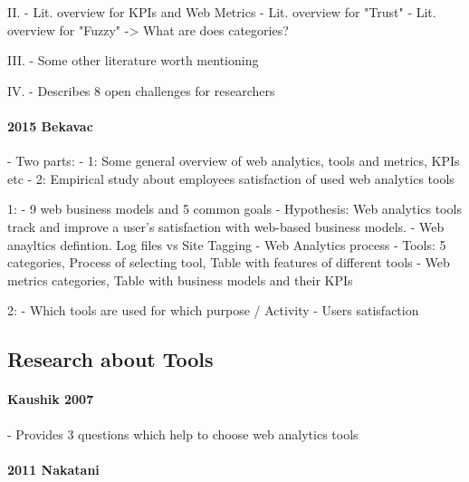II.
- Lit. overview for KPIs and Web Metrics
- Lit. overview for "Trust"
- Lit. overview for "Fuzzy"
-> What are does categories?


III.
- Some other literature worth mentioning


IV.
- Describes 8 open challenges for researchers




\paragraph{2015 Bekavac}

- Two parts:
	- 1: Some general overview of web analytics, tools and metrics, KPIs etc
	- 2: Empirical study about employees satisfaction of used web analytics tools

1: 
- 9 web business models and 5 common goals
- Hypothesis: Web analytics tools track and improve a user’s satisfaction with web-based business models.
- Web anayltics defintion. Log files vs Site Tagging
- Web Analytics process
- Tools: 5 categories, Process of selecting tool, Table with features of different tools
- Web metrics categories, Table with business models and their KPIs

2:
- Which tools are used for which purpose / Activity
- Users satisfaction





\subsection{Research about Tools}



\paragraph{Kaushik 2007}
- Provides 3 questions which help to choose web analytics tools




\paragraph{2011 Nakatani}


